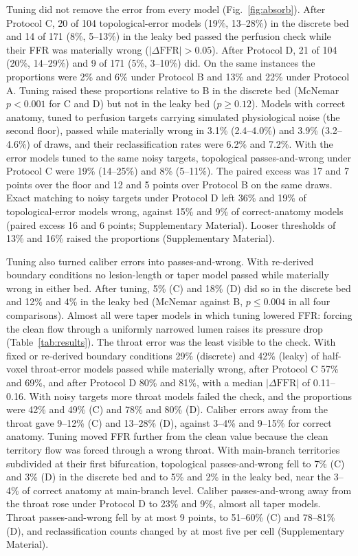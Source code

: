 \documentclass[journal,twoside,web]{ieeecolor}
\begin{document}
Tuning did not remove the error from every model (Fig.~\ref{fig:absorb}). After Protocol C, 20 of 104 topological-error models (19\%, 13--28\%) in the discrete bed and 14 of 171 (8\%, 5--13\%) in the leaky bed passed the perfusion check while their FFR was materially wrong ($|\Delta\mathrm{FFR}| > 0.05$). After Protocol D, 21 of 104 (20\%, 14--29\%) and 9 of 171 (5\%, 3--10\%) did. On the same instances the proportions were 2\% and 6\% under Protocol B and
13\% and 22\% under Protocol A. Tuning raised these proportions relative to B in the discrete bed (McNemar $p < 0.001$ for C and D)
but not in the leaky bed ($p \geq 0.12$). Models with
correct anatomy, tuned to perfusion targets carrying simulated physiological noise (the second floor), passed while materially wrong in 3.1\% (2.4--4.0\%) and 3.9\% (3.2--4.6\%) of draws, and their reclassification rates were 6.2\% and 7.2\%. With the error models tuned to the same noisy targets, topological passes-and-wrong under Protocol C were 19\% (14--25\%) and 8\% (5--11\%). The paired excess was 17 and 7 points over the floor and 12 and 5 points over Protocol B on the same draws. Exact matching to noisy targets under Protocol D left 36\% and 19\% of topological-error models wrong, against 15\% and 9\% of correct-anatomy models (paired excess 16 and 6 points; Supplementary Material).
Looser thresholds of 13\% and 16\% raised the proportions (Supplementary Material).

Tuning also turned caliber errors into passes-and-wrong. With re-derived boundary conditions no lesion-length or taper model
passed while materially wrong in either bed. After tuning, 5\% (C) and 18\% (D) did so in the discrete bed and 12\%
and 4\% in the leaky bed (McNemar against B, $p \leq 0.004$ in all four comparisons). Almost all were taper models
in which tuning lowered FFR: forcing the clean flow through a uniformly narrowed lumen raises its pressure drop
(Table~\ref{tab:results}). The throat error was the least visible to the check. With fixed or re-derived boundary conditions 29\% (discrete) and 42\% (leaky) of half-voxel throat-error models passed while materially wrong, after Protocol C 57\% and 69\%, and after Protocol D 80\% and 81\%, with a median $|\Delta\mathrm{FFR}|$ of 0.11--0.16. With noisy targets more throat models failed the check, and the proportions were 42\% and 49\% (C) and 78\% and 80\% (D). Caliber errors away from the throat gave 9--12\% (C) and 13--28\% (D), against 3--4\% and 9--15\% for correct anatomy. Tuning moved FFR further from the clean value because the clean territory flow was forced through a wrong throat.
With main-branch territories subdivided at their first bifurcation, topological passes-and-wrong fell to 7\% (C) and 3\% (D) in the discrete bed and to 5\% and 2\% in the leaky bed, near the 3--4\% of correct anatomy at main-branch level. Caliber passes-and-wrong away from the throat rose under Protocol D to 23\% and 9\%, almost all taper models. Throat passes-and-wrong fell by at most 9 points, to 51--60\% (C) and 78--81\% (D), and reclassification counts changed by at most five per cell (Supplementary Material).
\end{document}
